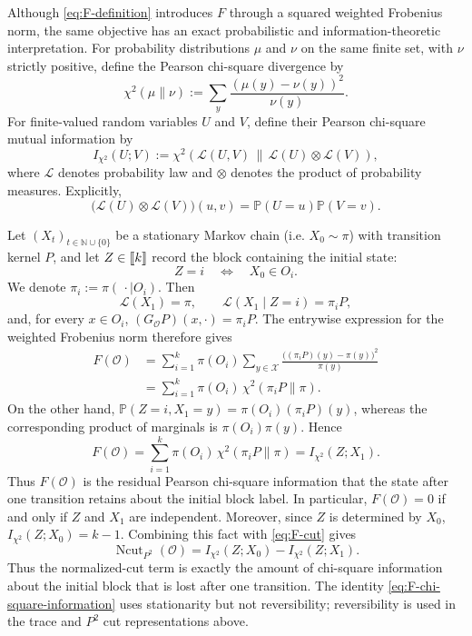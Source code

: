 \documentclass[11pt]{article}
\newcommand{\1}{\mathbf{1}}
\newcommand{\X}{\mathcal{X}}
\providecommand{\llbracket}{\mathopen{[\mkern-2.7mu[}}
\providecommand{\rrbracket}{\mathclose{]\mkern-2.7mu]}}
\begin{document}
Although \eqref{eq:F-definition} introduces $F$ through a squared
weighted Frobenius norm, the same objective has an exact probabilistic
and information-theoretic interpretation.  For probability
distributions $\mu$ and $\nu$ on the same finite set, with $\nu$
strictly positive, define the Pearson chi-square divergence by
\[
    \chi^2(\mu\|\nu)
    :=\sum_y\frac{(\mu(y)-\nu(y))^2}{\nu(y)}.
\]
For finite-valued random variables $U$ and $V$, define their Pearson
chi-square mutual information by
\[
    I_{\chi^2}(U;V)
    :=\chi^2\!\left(
        \mathcal L(U,V)
        \,\middle\|\,
        \mathcal L(U)\otimes\mathcal L(V)
      \right),
\]
where $\mathcal L$ denotes probability law and $\otimes$ denotes the
product of probability measures.  Explicitly,
\[
\bigl(\mathcal L(U)\otimes\mathcal L(V)\bigr)(u,v)
=
\mathbb P(U=u)\mathbb P(V=v).
\]

Let $(X_t)_{t \in \mathbb{N}\cup\{0\}}$ be a stationary Markov chain (i.e. $X_0\sim\pi$) with transition
kernel $P$, and let $Z\in\llbracket k\rrbracket$ record the block
containing the initial state:
\[
    Z=i
    \quad\Longleftrightarrow\quad
    X_0\in O_i.
\]
We denote $\pi_i:=\pi(\,\cdot\mid O_i)$.  Then
\[
    \mathcal L(X_1)=\pi,
    \qquad
    \mathcal L(X_1\mid Z=i)=\pi_iP,
\]
and, for every $x\in O_i$,
$(G_{\mathcal O}P)(x,\cdot)=\pi_iP$.  The entrywise expression for
the weighted Frobenius norm therefore gives
\[
\begin{aligned}
    F(\mathcal O)
    &=\sum_{i=1}^k \pi(O_i)
      \sum_{y\in\X}
      \frac{\bigl((\pi_iP)(y)-\pi(y)\bigr)^2}{\pi(y)}\\
    &=\sum_{i=1}^k \pi(O_i)\,\chi^2(\pi_iP\|\pi).
\end{aligned}
\]
On the other hand,
$\mathbb P(Z=i,X_1=y)=\pi(O_i)(\pi_iP)(y)$, whereas the corresponding
product of marginals is $\pi(O_i)\pi(y)$.  Hence
\begin{equation}
    F(\mathcal O)
    =\sum_{i=1}^k \pi(O_i)\,\chi^2(\pi_iP\|\pi)
    =I_{\chi^2}(Z;X_1).
    \label{eq:F-chi-square-information}
\end{equation}
Thus $F(\mathcal O)$ is the residual Pearson chi-square information
that the state after one transition retains about the initial block
label.   In particular,
$F(\mathcal O)=0$ if and only if $Z$ and $X_1$ are independent.
Moreover, since $Z$ is determined by $X_0$,
$I_{\chi^2}(Z;X_0)=k-1$.  Combining this fact with
\eqref{eq:F-cut} gives
\[
    \operatorname{Ncut}_{P^2}(\mathcal O)
    =I_{\chi^2}(Z;X_0)-I_{\chi^2}(Z;X_1).
\]
Thus the normalized-cut term is exactly the amount of chi-square
information about the initial block that is lost after one
transition.  The identity \eqref{eq:F-chi-square-information} uses
stationarity but not reversibility; reversibility is used in the
trace and $P^2$ cut representations above.
\end{document}
